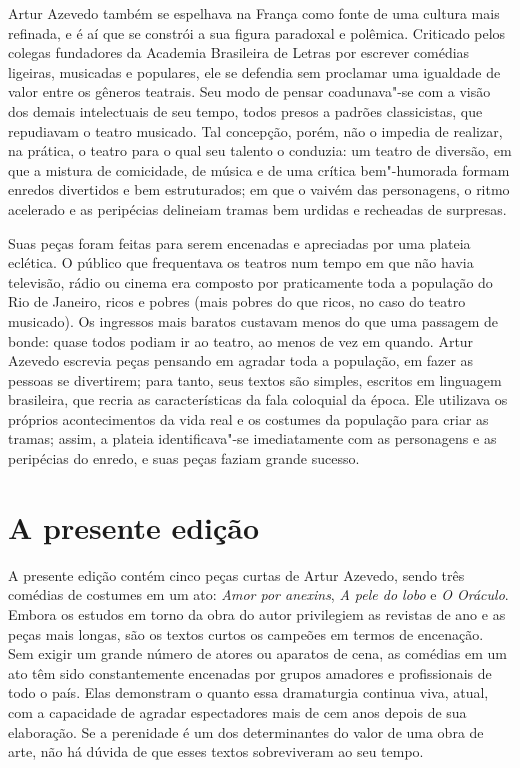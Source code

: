 Artur Azevedo também se espelhava na França como fonte de uma cultura
mais refinada, e é aí que se constrói a sua figura paradoxal e
polêmica. Criticado pelos colegas fundadores da Academia Brasileira de
Letras por escrever comédias ligeiras, musicadas e populares, ele se
defendia sem proclamar uma igualdade de valor entre os gêneros
teatrais. Seu modo de pensar coadunava"-se com a visão dos demais
intelectuais de seu tempo, todos presos a padrões classicistas, que
repudiavam o teatro musicado. Tal concepção, porém, não o impedia de
realizar, na prática, o teatro para o qual seu talento o conduzia: um
teatro de diversão, em que a mistura de comicidade, de música e de uma
crítica bem"-humorada formam enredos divertidos e bem estruturados; em
que o vaivém das personagens, o ritmo acelerado e as peripécias
delineiam tramas bem urdidas e recheadas de surpresas.

Suas peças foram feitas para serem encenadas e apreciadas por uma
plateia eclética. O público que frequentava os teatros num tempo em que
não havia televisão, rádio ou cinema era composto por praticamente toda
a população do Rio de Janeiro, ricos e pobres (mais pobres do que
ricos, no caso do teatro musicado). Os ingressos mais baratos custavam
menos do que uma passagem de bonde: quase todos podiam ir ao teatro, ao
menos de vez em quando. Artur Azevedo escrevia peças pensando em
agradar toda a população, em fazer as pessoas se divertirem; para
tanto, seus textos são simples, escritos em linguagem brasileira, que
recria as características da fala coloquial da época. Ele utilizava os
próprios acontecimentos da vida real e os costumes da população para
criar as tramas; assim, a plateia identificava"-se imediatamente com as
personagens e as peripécias do enredo, e suas peças faziam grande
sucesso.

\section{A presente edição}

A presente edição contém cinco peças curtas de Artur Azevedo, sendo três
comédias de costumes em um ato: \textit{Amor por anexins}, \textit{A
pele do lobo }e \textit{O Oráculo}. Embora os estudos em torno da obra
do autor privilegiem as revistas de ano e as peças mais longas, são os
textos curtos os campeões em termos de encenação. Sem exigir um grande
número de atores ou aparatos de cena, as comédias em um ato têm sido
constantemente encenadas por grupos amadores e profissionais de todo o
país. Elas demonstram o quanto essa dramaturgia continua viva, atual,
com a capacidade de agradar espectadores mais de cem anos depois de sua
elaboração. Se a perenidade é um dos determinantes do valor de uma obra
de arte, não há dúvida de que esses textos sobreviveram ao seu tempo. 


